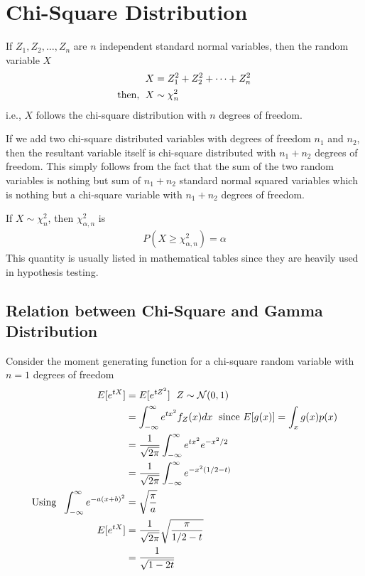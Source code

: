 \documentclass[../probability-notes.tex]{subfiles}
\begin{document}
    \section{Chi-Square Distribution}\label{chi_square}
    If $Z_{1}, Z_{2}, \ldots, Z_{n}$ are $n$ independent standard normal variables, then the random variable $X$
    \begin{align*}
        X &= Z_{1}^{2} + Z_{2}^{2} + \cdots + Z_{n}^{2}\\
        \text{then, \;} X &\sim \chi_{n}^{2}
    \end{align*}
    i.e., $X$ follows the chi-square distribution with $n$ degrees of freedom.\newline

    If we add two chi-square distributed variables with degrees of freedom $n_{1}$ and $n_{2}$, then the resultant variable itself is chi-square distributed with $n_{1} + n_{2}$ degrees of freedom. This simply follows from the fact that the sum of the two random variables is nothing but sum of $n_{1} + n_{2}$ standard normal squared variables which is nothing but a chi-square variable with $n_{1} + n_{2}$ degrees of freedom.\newline

    If $X \sim \chi_{n}^{2}$, then $\chi_{\alpha, n}^{2}$ is
    \begin{align*}
        P(X \geq \chi_{\alpha, n}^{2}) = \alpha
    \end{align*}
    This quantity is usually listed in mathematical tables since they are heavily used in hypothesis testing.\newline

    \subsection{Relation between Chi-Square and Gamma Distribution}\label{sec:rel_gamma_chi}
    Consider the moment generating function for a chi-square random variable with $n=1$ degrees of freedom
    \begin{align*}
        E[e^{tX}] &= E[e^{tZ^{2}}] \text{\; $Z \sim \mathcal{N}(0, 1)$}\\
        &= \int_{-\infty}^{\infty} e^{tx^{2}} f_{Z}(x) dx \text{\; since $E[g(x)] = \int_{x} g(x)p(x)$}\\
        &= \frac{1}{\sqrt{2\pi}} \int_{-\infty}^{\infty} e^{tx^{2}} e^{-x^{2}/2}\\
        &= \frac{1}{\sqrt{2\pi}} \int_{-\infty}^{\infty} e^{-x^{2}(1/2 - t)}\\
        \text{Using \;} \int_{-\infty}^{\infty} e^{-a(x+b)^{2}} &= \sqrt{\frac{\pi}{a}}\\
        E[e^{tX}] &= \frac{1}{\sqrt{2\pi}} \sqrt{\frac{\pi}{1/2 - t}}\\
        &= \frac{1}{\sqrt{1 - 2t}}
    \end{align*}
\end{document}
